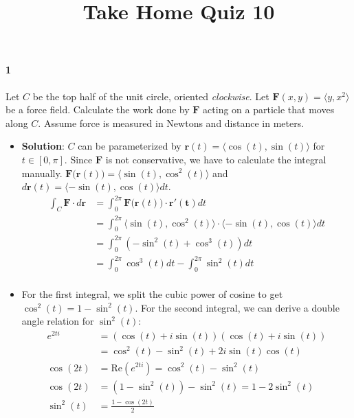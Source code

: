 \documentclass{article}
\title{Take Home Quiz 10}
\author{}
\date{}
\begin{document}
    \maketitle

    \paragraph{1} Let $C$ be the top half of the unit circle, oriented \textit{clockwise}.
    Let $\mathbf{F}(x,y)=\langle y,x^2\rangle$ be a force field.
    Calculate the work done by $\mathbf{F}$ acting on a particle that moves along $C$.
    Assume force is measured in Newtons and distance in meters.
    \\
    \begin{itemize}
        \item \textbf{Solution}: $C$ can be parameterized by $\mathbf{r}(t)=\langle \cos(t), \sin(t)\rangle $ for $t \in [0,\pi]$.
        Since $\mathbf{F}$ is not conservative, we have to calculate the integral manually.
        $\mathbf{F(r}(t)) = \langle \sin(t), \cos^2(t)\rangle $ and $d\mathbf{r}(t)=\langle -\sin(t), \cos(t)\rangle dt$.
        \begin{align*}
            \int_C \mathbf{F\cdot }d\mathbf{r} &= \int_0^{2\pi} \mathbf{F(r}(t)) \cdot \mathbf{r'(t)}dt \\
            &= \int_0^{2\pi} \langle \sin(t), \cos^{2}(t)\rangle  \cdot \langle -\sin(t), \cos(t)\rangle dt \\
            &= \int_0^{2\pi} (-\sin^{2}(t) + \cos^{3}(t))dt \\
            &= \int_0^{2\pi} \cos^{3}(t)dt - \int_0^{2\pi} \sin^{2}(t)dt \\
        \end{align*}
        \item For the first integral, we split the cubic power of cosine to get $\cos^{2}(t)=1-\sin^{2}(t)$.
        For the second integral, we can derive a double angle relation for $\sin^{2}(t)$:
        \begin{align*}
            e^{2ti} &= (\cos(t) + i\sin(t))(\cos(t) + i\sin(t)) \\
            &= \cos^{2}(t) - \sin^2(t) + 2i\sin(t)\cos(t) \\
            \cos(2t) &= \mathrm{Re}(e^{2ti}) = \cos^2(t)-\sin^2(t)\\
            \cos(2t) &= (1-\sin^{2}(t))-\sin^{2}(t) = 1-2\sin^{2}(t)\\
            \sin^2(t) &= \frac{1-\cos(2t)}{2}
        \end{align*}

\end{itemize}
\end{document}
